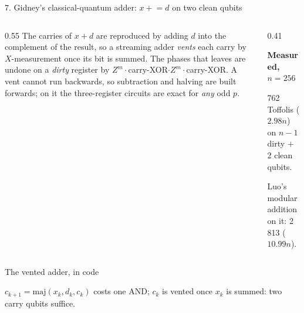 \documentclass[aspectratio=169,11pt]{beamer}
\newcommand{\peachtitle}[1]{{\bfseries\color{cverm}#1}\par\vskip1mm}
\newcommand{\code}[2][]{}
\begin{document}
\begin{frame}{7. Gidney's classical-quantum adder: $x\mathrel{+}=d$ on two clean qubits}
  \begin{columns}[T]
    \begin{column}{0.55\textwidth}
      The carries of $x+d$ are reproduced by adding $d$ into the complement of the result, so a streaming adder \emph{vents} each carry by $X$-measurement once its bit is summed.
      \vskip2mm
      The phases that leaves are undone on a \emph{dirty} register by $Z^m\cdot$carry-XOR$\cdot Z^m\cdot$carry-XOR.
      \vskip2mm
      {\small A vent cannot run backwards, so subtraction and halving are built forwards; on it the three-register circuits are exact for \emph{any} odd $p$.}
    \end{column}
    \begin{column}{0.41\textwidth}
      \begin{peachblock}\peachtitle{Measured, $n=256$}
        762 Toffolis ($2.98n$) on $n-1$ dirty $+$ 2 clean qubits.\par
        Luo's modular addition on it: 2\,813 ($10.99n$).
      \end{peachblock}
    \end{column}
  \end{columns}
\end{frame}

\begin{frame}[fragile]{The vented adder, in code}
  \code[basicstyle=\ttfamily\scriptsize]{vented_add.py}
  {\small $c_{k+1}=\mathrm{maj}(x_k,d_k,c_k)$ costs one AND; $c_k$ is vented once $x_k$ is summed: two carry qubits suffice.}
\end{frame}
\end{document}
